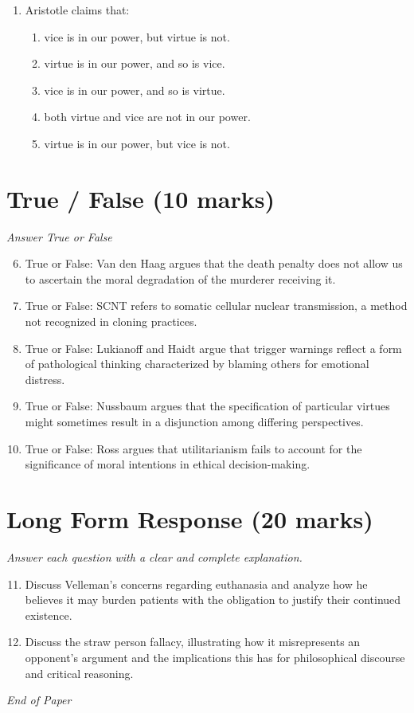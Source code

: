 \documentclass[12pt]{article}
\begin{document}
\begin{enumerate}[label=\arabic*.]
\begin{enumerate}[label=(\alph*)]
    \item Lutherans
    \item Methodists
    \item Greek Orthodox
    \item Quakers
\end{enumerate}
\item Aristotle claims that:
\begin{enumerate}[label=(\alph*)]
    \item vice is in our power, but virtue is not.
    \item virtue is in our power, and so is vice.
    \item vice is in our power, and so is virtue.
    \item both virtue and vice are not in our power.
    \item virtue is in our power, but vice is not.
\end{enumerate}
\end{enumerate}

\section*{True / False (10 marks)}
\textit{Answer True or False}
\begin{enumerate}[label=\arabic*.]
\setcounter{enumi}{5}
\item True or False: Van den Haag argues that the death penalty does not allow us to ascertain the moral degradation of the murderer receiving it.
\item True or False: SCNT refers to somatic cellular nuclear transmission, a method not recognized in cloning practices.
\item True or False: Lukianoff and Haidt argue that trigger warnings reflect a form of pathological thinking characterized by blaming others for emotional distress.
\item True or False: Nussbaum argues that the specification of particular virtues might sometimes result in a disjunction among differing perspectives.
\item True or False: Ross argues that utilitarianism fails to account for the significance of moral intentions in ethical decision-making.
\end{enumerate}

\section*{Long Form Response (20 marks)}
\textit{Answer each question with a clear and complete explanation.}
\begin{enumerate}[label=\arabic*.]
\setcounter{enumi}{10}
\item Discuss Velleman's concerns regarding euthanasia and analyze how he believes it may burden patients with the obligation to justify their continued existence.
\item Discuss the straw person fallacy, illustrating how it misrepresents an opponent's argument and the implications this has for philosophical discourse and critical reasoning.
\end{enumerate}

\vfill
\noindent\textit{End of Paper}
\end{document}
